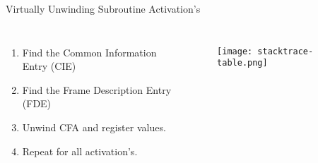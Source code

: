 \begin{frame}{Virtually Unwinding Subroutine Activation's}
    \begin{columns}[c] %

        \begin{enumerate}
        	\item Find the Common Information Entry (CIE)
		\item Find the Frame Description Entry (FDE)
		\item Unwind CFA and register values.
		\item Repeat for all activation's.
        \end{enumerate}

	\begin{figure}
		\texttt{[image: stacktrace-table.png]}
	\end{figure}
    \end{columns}

\end{frame}


